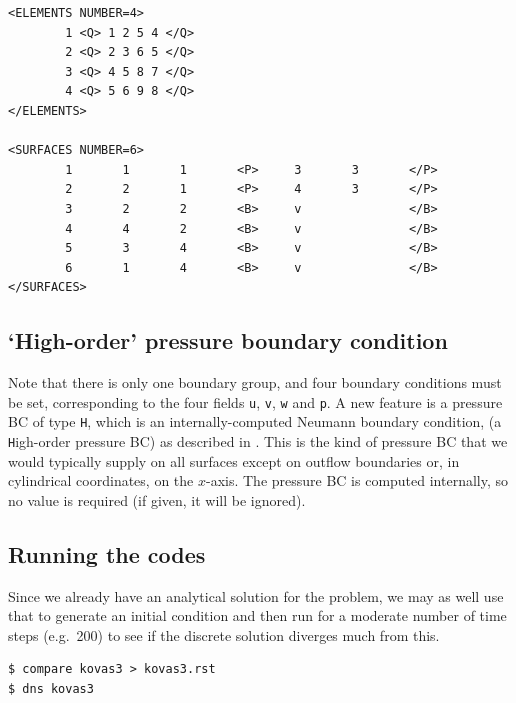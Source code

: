 \documentclass[11pt]{report}
\newcommand{\eg}{e.g.\ } \newcommand{\CC}{\mathrm{c.c.}}
\begin{document}
{\begin{verbatim}
<ELEMENTS NUMBER=4>
        1 <Q> 1 2 5 4 </Q>
        2 <Q> 2 3 6 5 </Q>
        3 <Q> 4 5 8 7 </Q>
        4 <Q> 5 6 9 8 </Q>
</ELEMENTS>

<SURFACES NUMBER=6>
        1       1       1       <P>     3       3       </P>
        2       2       1       <P>     4       3       </P>
        3       2       2       <B>     v               </B>
        4       4       2       <B>     v               </B>
        5       3       4       <B>     v               </B>
        6       1       4       <B>     v               </B>
</SURFACES>
\end{verbatim}
}

\subsection{`High-order' pressure boundary condition}

Note that there is only one boundary group, and four boundary
conditions must be set, corresponding to the four fields \verb+u+,
\verb+v+, \verb+w+ and \verb+p+.  A new feature is a pressure BC of
type \verb+H+, which is an internally-computed Neumann boundary
condition, (a \verb+H+igh-order pressure BC) as described in
\citet{kio91}.  This is the kind of pressure BC that we would
typically supply on all surfaces except on outflow boundaries or, in
cylindrical coordinates, on the $x$-axis.  The pressure BC is computed
internally, so no value is required (if given, it will be ignored).

\subsection{Running the codes}

Since we already have an analytical solution for the problem, we may
as well use that to generate an initial condition and then run for a
moderate number of time steps (\eg 200) to see if the discrete
solution diverges much from this.
{\small
\begin{verbatim}
$ compare kovas3 > kovas3.rst
$ dns kovas3
\end{verbatim}
}
\end{document}
